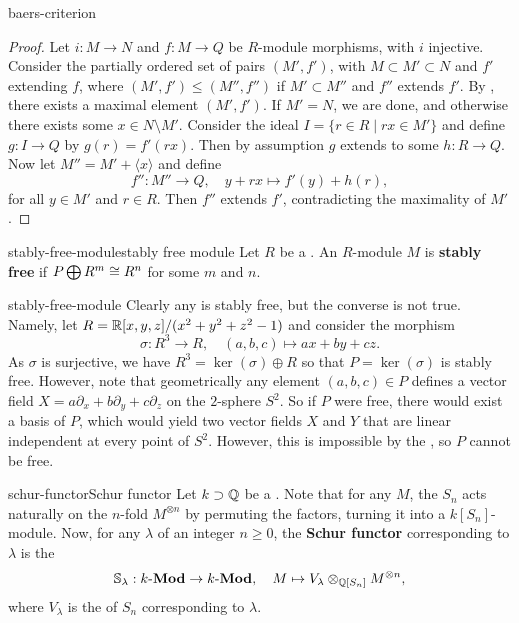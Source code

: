 \begin{example}{baers-criterion}
    \begin{proof}
        Let $i : M \to N$ and $f : M \to Q$ be $R$-module morphisms, with $i$ injective. Consider the partially ordered set of pairs $(M', f')$, with $M \subset M' \subset N$ and $f'$ extending $f$, where $(M', f') \le (M'', f'')$ if $M' \subset M''$ and $f''$ extends $f'$. By , there exists a maximal element $(M', f')$. If $M' = N$, we are done, and otherwise there exists some $x \in N \setminus M'$. Consider the ideal $I = \{ r \in R \mid rx \in M' \}$ and define $g : I \to Q$ by $g(r) = f'(rx)$. Then by assumption $g$ extends to some $h : R \to Q$. Now let $M'' = M' + \langle x \rangle$ and define
        \[ f'' : M'' \to Q, \quad y + rx \mapsto f'(y) + h(r) , \]
        for all $y \in M'$ and $r \in R$. Then $f''$ extends $f'$, contradicting the maximality of $M'$.
    \end{proof}
\end{example}

\begin{topic}{stably-free-module}{stably free module}
    Let $R$ be a . An $R$-module $M$ is \textbf{stably free} if $P \bigoplus R^m \cong R^n$ for some $m$ and $n$.
\end{topic}

\begin{example}{stably-free-module}
    Clearly any  is stably free, but the converse is not true. Namely, let $R = \mathbb{R}[x, y, z] / (x^2 + y^2 + z^2 - 1)$ and consider the morphism
    \[ \sigma : R^3 \to R, \quad (a, b, c) \mapsto ax + by + cz . \]
    As $\sigma$ is surjective, we have $R^3 = \ker(\sigma) \oplus R$ so that $P = \ker(\sigma)$ is stably free. However, note that geometrically any element $(a, b, c) \in P$ defines a vector field $X = a \partial_x + b \partial_y + c \partial_z$ on the $2$-sphere $S^2$. So if $P$ were free, there would exist a basis of $P$, which would yield two vector fields $X$ and $Y$ that are linear independent at every point of $S^2$. However, this is impossible by the , so $P$ cannot be free.
\end{example}

\begin{topic}{schur-functor}{Schur functor}
    Let $k \supset \mathbb{Q}$ be a . Note that for any  $M$, the  $S_n$ acts naturally on the $n$-fold  $M^{\otimes n}$ by permuting the factors, turning it into a $k[S_n]$-module. Now, for any  $\lambda$ of an integer $n \ge 0$, the \textbf{Schur functor} corresponding to $\lambda$ is the 
    \[ \mathbb{S}_\lambda : k\textup{-}\textbf{Mod} \to k\textup{-}\textbf{Mod}, \quad M \mapsto V_\lambda \otimes_{\mathbb{Q}[S_n]} M^{\otimes n} , \]
    where $V_\lambda$ is the   of $S_n$ corresponding to $\lambda$.
\end{topic}

